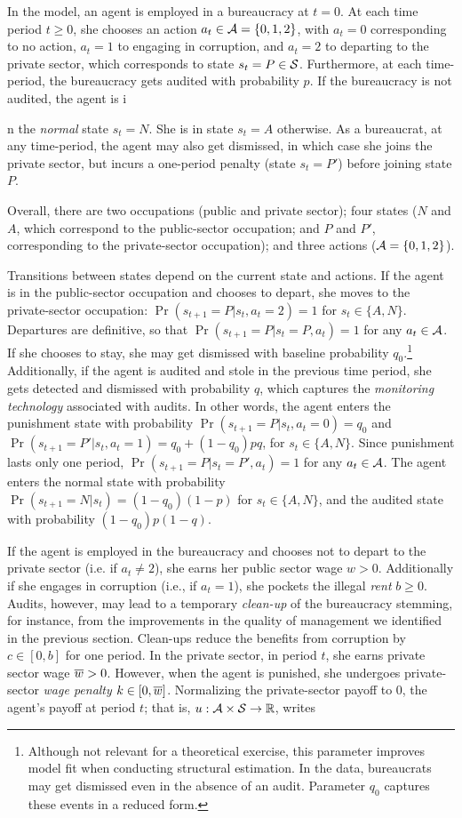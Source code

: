 In the model, an agent is employed in a bureaucracy at $t = 0$. At each time period $t \geq 0$, she chooses an action $a_t \in \mathcal{A} = \{0,1,2\}$, with $a_t = 0$ corresponding to no action, $a_t = 1$ to engaging in corruption, and $a_t = 2$ to departing to the private sector, which corresponds to state $s_t = P \in \mathcal{S}$. Furthermore, at each time-period, the bureaucracy gets audited with probability $p$. If the bureaucracy is not audited, the agent is i{n the \emph{normal} state $s_t = N$. She is in state $s_t = A$ otherwise. As a bureaucrat, at any time-period, the agent may also get dismissed, in which case she joins the private sector, but incurs a one-period penalty (state $s_t = P'$) before joining state $P$. 

Overall, there are two occupations (public and private sector); four states ($N$ and $A$, which correspond to the public-sector occupation; and $P$ and $P'$, corresponding to the private-sector occupation); and three actions ($\mathcal{A} = \{0,1,2\}$). 

Transitions between states depend on the current state and actions. If the agent is in the public-sector occupation and chooses to depart, she moves to the private-sector occupation: $\Pr(s_{t+1} = P | s_t, a_t = 2) = 1$ for $s_t \in \{A, N\}$. Departures are definitive, so that $\Pr(s_{t+1} = P | s_t = P, a_t) = 1$ for any $a_t \in \mathcal{A}$. If she chooses to stay, she may get dismissed with baseline probability $q_0$.\footnote{Although not relevant for a theoretical exercise, this parameter improves model fit when conducting structural estimation. In the data, bureaucrats may get dismissed even in the absence of an audit. Parameter $q_0$ captures these events in a reduced form.} Additionally, if the agent is audited and stole in the previous time period, she gets detected and dismissed with probability $q$, which captures the \emph{monitoring technology} associated with audits. In other words, the agent enters the punishment state with probability $\Pr(s_{t+1} = P | s_t, a_t = 0) = q_0$ and $\Pr(s_{t+1} = P' | s_t, a_t = 1) = q_0 + (1-q_0) p q$, for $s_t \in \{A, N\}$. Since punishment lasts only one period, $\Pr(s_{t+1} = P | s_t = P', a_t) = 1$ for any $a_t \in \mathcal{A}$. The agent enters the normal state with probability $\Pr(s_{t+1} = N | s_t) = (1-q_0)(1-p)$ for $s_t \in \{A,N\}$, and the audited state with probability $(1-q_0)p(1-q)$.

If the agent is employed in the bureaucracy and chooses not to depart to the private sector (i.e. if $a_t \neq 2$), she earns her public sector wage $w > 0$. Additionally if she engages in corruption (i.e., if $a_t = 1$), she pockets the illegal \emph{rent} $b \geq 0$. Audits, however, may lead to a temporary \emph{clean-up} of the bureaucracy stemming, for instance, from the improvements in the quality of management we identified in the previous section. Clean-ups reduce the benefits from corruption by $c \in [0,b]$ for one period. In the private sector, in period $t$, she earns private sector wage $\overline{w} > 0$. However, when the agent is punished, she undergoes private-sector \emph{wage penalty} $k \in [0, \overline{w}]$. Normalizing the private-sector payoff to 0, the agent's payoff at period $t$; that is, $u : \mathcal{A} \times \mathcal{S} \rightarrow \mathbb{R}$, writes

}
